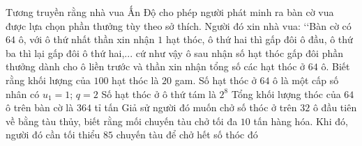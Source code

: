 \begin{ex}%
	Tương truyền rằng nhà vua Ấn Độ cho phép người phát minh ra bàn cờ vua được lựa chọn phần thưởng tùy theo sở thích. Người đó xin nhà vua: \lq\lq Bàn cờ có $64$ ô, với ô thứ nhất thần xin nhận $1$ hạt thóc, ô thứ hai thì gấp đôi ô đầu, ô thứ ba thì lại gấp đôi ô thứ hai,... cứ như vậy ô sau nhận số hạt thóc gấp đôi phần thưởng dành cho ô liền trước và thần xin nhận tổng số các hạt thóc ở $64$ ô. Biết rằng khối lượng  của $100$ hạt thóc là $20$ gam.
	\choiceTF 
		{\True Số hạt thóc ở $64$ ô là một cấp số nhân có $u_1=1$; $q=2$} 
		{Số hạt thóc ở ô thứ tám  là $2^8$}
		{Tổng khối lượng thóc của $64$  ô trên bàn cờ là $364$ tỉ tấn}
		{Giả sử người đó muốn chở  số thóc ở trên $32$ ô đầu tiên về bằng tàu thủy, biết rằng mối chuyến tàu chở tối đa $10$ tấn hàng hóa. Khi đó, người đó cần tối thiểu $85$ chuyến tàu để chở hết số thóc đó}
\end{ex}

